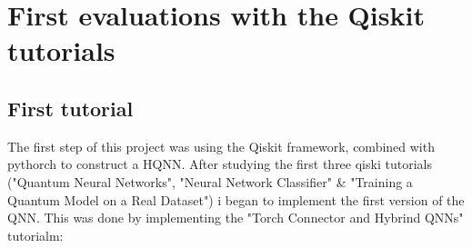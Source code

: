 \documentclass[conference]{IEEEtran}
\begin{document}
\section*{\fontsize{16}{20}\selectfont First evaluations with the Qiskit tutorials}

\subsection*{\fontsize{16}{20}\selectfont First tutorial}


The first step of this project was using the Qiskit framework, combined with pythorch to construct a HQNN.
After studying the first three qiski tutorials ("Quantum Neural Networks", "Neural Network Classifier" \& "Training a Quantum Model on a Real Dataset") i began
to implement the first version of the QNN. This was done by implementing the "Torch Connector and Hybrind QNNs" tutorialm:
\end{document}
